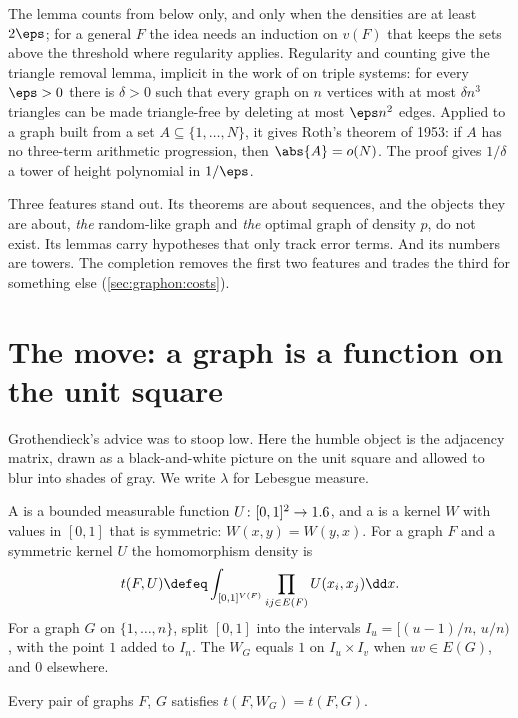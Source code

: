 \begin{refsection}
The lemma counts from below only, and only when the densities are at least $2\eps$; for a general $F$ the idea needs an induction on $v(F)$ that keeps the sets above the threshold where regularity applies. Regularity and counting give the triangle removal lemma, implicit in the work of \textcite{RuzsaSzemeredi1978} on triple systems: for every $\eps>0$ there is $\delta>0$ such that every graph on $n$ vertices with at most $\delta n^3$ triangles can be made triangle-free by deleting at most $\eps n^2$ edges. Applied to a graph built from a set $A\subseteq\{1,\dots,N\}$, it gives Roth's theorem of 1953: if $A$ has no three-term arithmetic progression, then $\abs{A}=o(N)$. The proof gives $1/\delta$ a tower of height polynomial in $1/\eps$.

Three features stand out. Its theorems are about sequences, and the objects they are about, \emph{the} random-like graph and \emph{the} optimal graph of density $p$, do not exist. Its lemmas carry hypotheses that only track error terms. And its numbers are towers. The completion removes the first two features and trades the third for something else (\cref{sec:graphon:costs}).

\section{The move: a graph is a function on the unit square}\label{sec:graphon:move}

Grothendieck's advice was to stoop low. Here the humble object is the adjacency matrix, drawn as a black-and-white picture on the unit square and allowed to blur into shades of gray. We write $\lambda$ for Lebesgue measure.

\begin{definition}[Graphons]\label{def:graphon:graphon}
A  is a bounded measurable function $U\colon[0,1]^2\to1.6$, and a  is a kernel $W$ with values in $[0,1]$ that is symmetric: $W(x,y)=W(y,x)$. For a graph $F$ and a symmetric kernel $U$ the homomorphism density is
\[
  t(F,U)\defeq\int_{[0,1]^{V(F)}}\prod_{ij\in E(F)}U(x_i,x_j)\dd x .
\]
For a graph $G$ on $\{1,\dots,n\}$, split $[0,1]$ into the intervals $I_u={[(u-1)/n,\,u/n)}$, with the point $1$ added to $I_n$. The  $W_G$ equals $1$ on $I_u\times I_v$ when $uv\in E(G)$, and $0$ elsewhere.
\end{definition}


\begin{lemma}\label{lem:graphon:step}
Every pair of graphs $F$, $G$ satisfies $t(F,W_G)=t(F,G)$.
\end{lemma}


\end{refsection}
